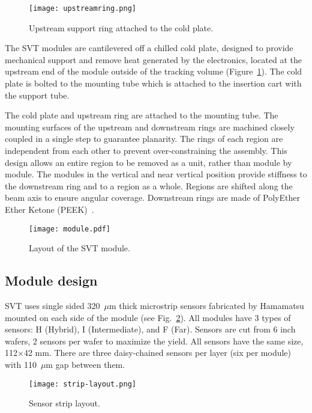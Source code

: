\begin{figure}[hbt] 
\centering 
\texttt{[image: upstreamring.png]}
\caption{Upstream support ring attached to the cold plate.}
\label{fig:upstreamring}
\end{figure}

 The SVT modules are cantilevered off a chilled cold plate, designed to provide mechanical support and remove heat generated by the electronics, located at the upstream end of the module outside of the tracking volume (Figure~\ref{fig:upstreamring}). The cold plate is bolted to the mounting tube which is attached to the insertion cart with the support tube. 
 
The cold plate and upstream ring are attached to the mounting tube. The mounting surfaces of the upstream and downstream rings are machined closely coupled in a single step to guarantee planarity. The rings of each region are independent from each other to prevent over-constraining the assembly. This design allows an entire region to be removed as a unit, rather than module by module. The modules in the vertical and near vertical position provide stiffness to the downstream ring and to a region as a whole. Regions are shifted along the beam axis to ensure angular coverage. Downstream rings are made of PolyEther Ether Ketone (PEEK)~\cite{NIMVCC}. 

\begin{figure}[hbt] 
\centering 
\texttt{[image: module.pdf]}
\caption{Layout of the SVT module.}
\label{fig:module}
\end{figure}

\subsection{Module design}

SVT uses single sided 320~$\mu$m thick microstrip sensors fabricated by Hamamatsu mounted on each side of the module (see Fig.~\ref{fig:module}). All modules have 3 types of sensors: H (Hybrid), I (Intermediate), and F (Far). Sensors are cut from 6 inch wafers, 2 sensors per wafer to maximize the yield. All sensors have the same size, 112$\times$42 mm. There are three daisy-chained sensors per layer (six per module) with 110~$\mu$m gap between them. 

\begin{figure}[hbt] 
\centering 
\texttt{[image: strip-layout.png]}
\caption{Sensor strip layout.}
\label{fig:strip-layout}
\end{figure}

